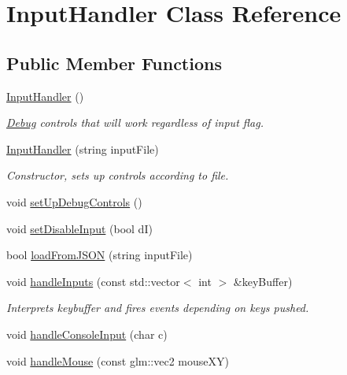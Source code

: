 \hypertarget{class_input_handler}{\section{Input\+Handler Class Reference}
\label{class_input_handler}
}
\subsection*{Public Member Functions}
\begin{DoxyCompactItemize}
\item 
\hyperlink{class_input_handler_a698aa4af4f326a9881835fda251ca996}{Input\+Handler} ()
\begin{DoxyCompactList}\small\item\em \hyperlink{class_debug}{Debug} controls that will work regardless of input flag. \end{DoxyCompactList}\item 
\hypertarget{class_input_handler_a5f4d9f7ba9a8a9c02f5fdef3e8fe79c8}{\hyperlink{class_input_handler_a5f4d9f7ba9a8a9c02f5fdef3e8fe79c8}{Input\+Handler} (string input\+File)}\label{class_input_handler_a5f4d9f7ba9a8a9c02f5fdef3e8fe79c8}

\begin{DoxyCompactList}\small\item\em Constructor, sets up controls according to file. \end{DoxyCompactList}\item 
void \hyperlink{class_input_handler_ab3359d443715abc1968a354a91796fde}{set\+Up\+Debug\+Controls} ()
\item 
void \hyperlink{class_input_handler_a163702711e7b2fac8ee03a50499cde36}{set\+Disable\+Input} (bool d\+I)
\item 
bool \hyperlink{class_input_handler_aeb71183f7023decf10d19b949480a574}{load\+From\+J\+S\+O\+N} (string input\+File)
\item 
\hypertarget{class_input_handler_ab3b5fe17099a9bffe0a1dcedf4a439ed}{void \hyperlink{class_input_handler_ab3b5fe17099a9bffe0a1dcedf4a439ed}{handle\+Inputs} (const std\+::vector$<$ int $>$ \&key\+Buffer)}\label{class_input_handler_ab3b5fe17099a9bffe0a1dcedf4a439ed}

\begin{DoxyCompactList}\small\item\em Interprets keybuffer and fires events depending on keys pushed. \end{DoxyCompactList}\item 
void \hyperlink{class_input_handler_a2ae198e972137bde4f2fe5b7c899a2e4}{handle\+Console\+Input} (char c)
\item 
void \hyperlink{class_input_handler_a0ebc7e1f1c6f9f53e8b7a97df8fb7233}{handle\+Mouse} (const glm\+::vec2 mouse\+X\+Y)
\end{DoxyCompactItemize}
